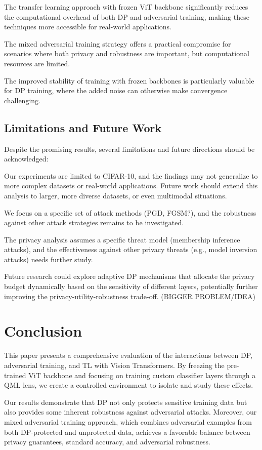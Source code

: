 \documentclass[11pt, conference]{IEEEtran}
\begin{document}
The transfer learning approach with frozen ViT backbone significantly reduces the computational overhead of both DP and adversarial training, making these techniques more accessible for real-world applications.

The mixed adversarial training strategy offers a practical compromise for scenarios where both privacy and robustness are important, but computational resources are limited.

The improved stability of training with frozen backbones is particularly valuable for DP training, where the added noise can otherwise make convergence challenging.

\subsection{Limitations and Future Work}
Despite the promising results, several limitations and future directions should be acknowledged:

Our experiments are limited to CIFAR-10, and the findings may not generalize to more complex datasets or real-world applications. Future work should extend this analysis to larger, more diverse datasets, or even multimodal situations.

We focus on a specific set of attack methods (PGD, FGSM?), and the robustness against other attack strategies remains to be investigated.

The privacy analysis assumes a specific threat model (membership inference attacks), and the effectiveness against other privacy threats (e.g., model inversion attacks) needs further study.

Future research could explore adaptive DP mechanisms that allocate the privacy budget dynamically based on the sensitivity of different layers, potentially further improving the privacy-utility-robustness trade-off. (BIGGER PROBLEM/IDEA)

\section{Conclusion}
This paper presents a comprehensive evaluation of the interactions between DP, adversarial training, and TL with Vision Transformers. By freezing the pre-trained ViT backbone and focusing on training custom classifier layers through a QML lens, we create a controlled environment to isolate and study these effects.

Our results demonstrate that DP not only protects sensitive training data but also provides some inherent robustness against adversarial attacks. Moreover, our mixed adversarial training approach, which combines adversarial examples from both DP-protected and unprotected data, achieves a favorable balance between privacy guarantees, standard accuracy, and adversarial robustness.
\end{document}

